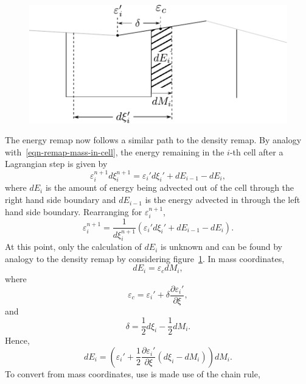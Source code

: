 \begin{figure}[t]
  \centering
  \includegraphics[width=0.7\linewidth]{energy_movement.pdf}
  \label{fig:energy_movement}
\end{figure}

The energy remap now follows a similar path to the density remap. By analogy with~\eqref{eqn-remap-mass-in-cell}, the energy remaining in the $i$-th cell after a Lagrangian step is given by
\begin{equation}
  \varepsilon_i^{n+1} d\xi_i^{n+1} = \varepsilon_i' d\xi_i' + dE_{i-1} - dE_i,
\end{equation}
where $dE_i$ is the amount of energy being advected out of the cell through the right hand side boundary and $dE_{i-1}$ is the energy advected in through the left hand side boundary. Rearranging for $\varepsilon_i^{n+1}$, 
\begin{equation}
  \varepsilon_i^{n+1}  = \frac{1}{d\xi_i^{n+1}}(\varepsilon_i'd\xi_i' + dE_{i-1} - dE_i).
  \label{eqn-remap-specific-energy-density}
\end{equation}
At this point, only the calculation of $dE_i$ is unknown and can be found by analogy to the density remap by considering figure~\ref{fig:energy_movement}. In mass coordinates,
\begin{equation}
  dE_i = \varepsilon_c dM_i,
\end{equation}
where
\begin{equation}
  \varepsilon_c = \varepsilon_i' + \delta \frac{\partial \varepsilon_i'}{\partial \xi},
\end{equation}
and
\begin{equation}
  \delta = \frac{1}{2}d\xi_i - \frac{1}{2}dM_i.
\end{equation}
Hence, 
\begin{equation}
  dE_i = \left( \varepsilon_i' + \frac{1}{2}\frac{\partial \varepsilon_i'}{\partial \xi} (d\xi_i - dM_i) \right)dM_i.
\end{equation}
To convert from mass coordinates, use is made use of the chain rule,

